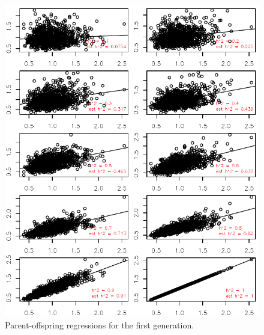 \documentclass[12pt,reqno,final,pdftex]{amsart}\usepackage[]{graphicx}\usepackage[]{color}
\newenvironment{knitrout}{}{} %
\theoremstyle{plain}
\numberwithin{equation}{part}
\begin{document}
\begin{knitrout}\scriptsize
{}\color{fgcolor}\begin{figure}

\includegraphics[width=\linewidth]{figure/unnamed-chunk-2-1} \hfill{}

\caption[Parent-offspring regressions for the first generation]{Parent-offspring regressions for the first generation.}\label{fig:unnamed-chunk-2}
\end{figure}


\end{knitrout}
\end{document}
